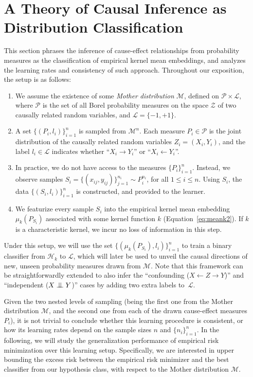 \documentclass{article}
\newcommand{\indep}{\mathrel{\text{\scalebox{1.07}{$\perp\mkern-10mu\perp$}}}}
\renewcommand{\P}{\mathcal{P}}
\renewcommand{\H}{\mathcal{H}}
\newcommand{\M}{\mathscr{M}}
\newcommand{\Z}{\mathcal{Z}}
\renewcommand{\L}{\mathcal{L}}
\begin{document}
\section{A Theory of Causal Inference as Distribution Classification}\label{sec:theory}
This section phrases the inference of cause-effect relationships from 
probability measures as the classification of empirical kernel mean embeddings,
and analyzes the learning rates and consistency of such approach.  Throughout
our exposition, the setup is as follows:
\begin{enumerate}
  \item We assume the existence of some \emph{Mother distribution} $\M$,
  defined on $\P \times \L$, where $\P$ is the set of all Borel probability
  measures on the space $\Z$ of two causally related random variables, and $\L
  = \{-1,+1\}$. 

  \item A set $\{(P_i, l_i)\}_{i=1}^n$ is sampled from $\M^n$. Each
  measure $P_i \in \P$ is the joint distribution of the causally related random
  variables $Z_i = (X_i, Y_i)$, and the label $l_i \in \L$ indicates whether
  ``$X_i \to Y_i$'' or ``$X_i \leftarrow Y_i$''.
  
  \item In practice, we do not have access to the measures $\{P_i\}_{i=1}^n$.
  Instead, we observe samples $S_i = \{(x_{ij}, y_{ij})\}_{j=1}^{n_i} \sim
  P_i^{n_i}$, for all $1 \leq i \leq n$. Using $S_i$, the data
  $\{(S_i,l_i)\}_{i=1}^n$ is constructed, and provided to the learner. 

  \item We featurize every sample $S_i$ into the empirical kernel mean
  embedding $\mu_k(P_{S_i})$ associated with some kernel function $k$
  (Equation~\ref{eq:meank2}). If $k$ is a characteristic kernel, we incur no
  loss of information in this step.
\end{enumerate}

Under this setup, we will use the set $\{(\mu_k(P_{S_i}),l_i)\}_{i=1}^n$ to
train a binary classifier from $\H_k$ to $\L$, which will later be used to
unveil the causal directions of new, unseen probability measures drawn from
$\M$.  Note that this framework can be straightforwardly extended to also infer
the ``confounding ($X \leftarrow Z \rightarrow Y$)'' and ``independent ($X
\indep Y$)'' cases by adding two extra labels to~$\mathcal{L}$.

Given the two nested levels of sampling (being the first one from the Mother
distribution $\M$, and the second one from each of the drawn cause-effect measures
$P_i$), it is not trivial to conclude whether this learning procedure is consistent, or how
its learning rates depend on the sample sizes $n$ and $\{n_i\}_{i=1}^n$.  In
the following, we will study the generalization performance of empirical risk
minimization over this learning setup.  Specifically, we are interested in
upper bounding the {excess risk} between the empirical risk minimizer and
the best classifier from our hypothesis class, with respect to the Mother
distribution $\M$.
\end{document}
